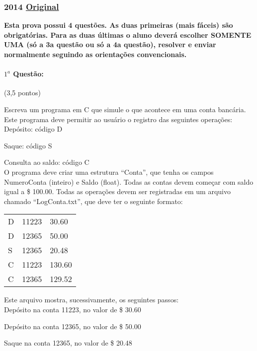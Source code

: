 \documentclass[12pt,a4paper]{article}
\newcommand{\original}[1]{\tiny \href{#1}{Original} \normalsize}
\begin{document}
\newpage


\subsubsection{2014 \original{https://drive.google.com/file/d/18J773gOPZI43GO21XQ-v4pyE1Q_6gso2/view?usp=sharing}}

\footnotesize{\textbf{Esta prova possui 4 questões. As duas primeiras (mais fáceis) são obrigatórias. Para as duas
últimas o aluno deverá escolher SOMENTE UMA (só a 3a questão ou só a 4a questão), resolver e
enviar normalmente seguindo as orientações convencionais.}}
\normalsize
\paragraph{$1^a$ Questão:} (3,5 pontos)

Escreva um programa em C que simule o que acontece em uma conta
bancária. Este programa deve permitir ao usuário o registro das seguintes operações:\\

Depósito: código D

Saque: código S

Consulta ao saldo: código C\\

O programa deve criar uma estrutura “Conta”, que tenha os campos NumeroConta (inteiro) e Saldo
(float). Todas as contas devem começar com saldo igual a \$ 100.00. Todas as operações devem ser
registradas em um arquivo chamado “LogConta.txt”, que deve ter o seguinte formato:

\begin{center}
\begin{tabular}{lll}
D & 11223 & 30.60 \\
D & 12365 & 50.00 \\
S & 12365 & 20.48 \\
C & 11223 & 130.60 \\
C & 12365 & 129.52 \\
\end{tabular}
\end{center}

Este arquivo mostra, sucessivamente, os seguintes passos:\\

Depósito na conta 11223, no valor de \$ 30.60

Depósito na conta 12365, no valor de \$ 50.00

Saque na conta 12365, no valor de \$ 20.48
\end{document}
